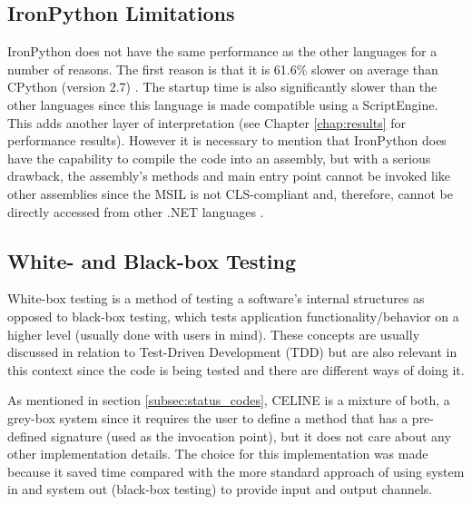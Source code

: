 \subsection{IronPython Limitations} \label{subsec:ironpython_limitations}
IronPython does not have the same performance as the other languages for a number of reasons. The first reason is that it is 61.6\% slower on average than CPython (version 2.7) \cite{IronPythonPerformance}. The startup time is also significantly slower than the other languages since this language is made compatible using a ScriptEngine. This adds another layer of interpretation (see Chapter \ref{chap:results} for performance results). However it is necessary to mention that IronPython does have the capability to compile the code into an assembly, but with a serious drawback, the assembly's methods and main entry point cannot be invoked like other assemblies since the MSIL is not CLS-compliant \cite{CLSCompliant} and, therefore, cannot be directly accessed from other .NET languages \cite{AccessingPythonCode}.


\subsection{White- and Black-box Testing} \label{subsec:whitebox_blackbox}
White-box testing is a method of testing a software's internal structures as opposed to black-box testing, which tests application functionality/behavior on a higher level (usually done with users in mind). These concepts are usually discussed in relation to Test-Driven Development (TDD) but are also relevant in this context since the code is being tested and there are different ways of doing it.

As mentioned in section \ref{subsec:status_codes}, CELINE is a mixture of both, a grey-box system since it requires the user to define a method that has a pre-defined signature (used as the invocation point), but it does not care about any other implementation details. The choice for this implementation was made because it saved time compared with the more standard approach of using system in and system out (black-box testing) to provide input and output channels.

